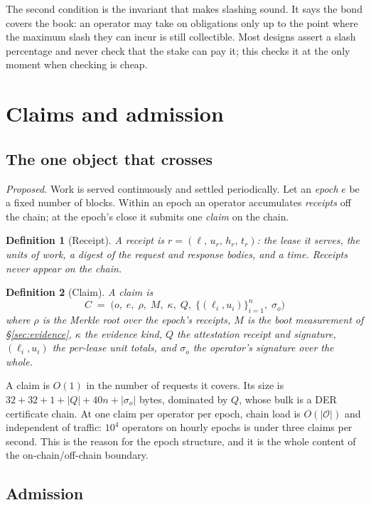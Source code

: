 \documentclass[11pt,a4paper]{article}
\newtheorem{definition}{Definition}[section]
\begin{document}
The second condition is the invariant that makes slashing sound. It says the
bond covers the book: an operator may take on obligations only up to the point
where the maximum slash they can incur is still collectible. Most designs assert
a slash percentage and never check that the stake can pay it; this checks it at
the only moment when checking is cheap.

\section{Claims and admission}
\label{sec:admit}

\subsection{The one object that crosses}

\emph{Proposed.} Work is served continuously and settled periodically. Let an
\emph{epoch} $e$ be a fixed number of blocks. Within an epoch an operator
accumulates \emph{receipts} off the chain; at the epoch's close it submits one
\emph{claim} on the chain.

\begin{definition}[Receipt]
A receipt is $r = (\ell,\, u_r,\, h_r,\, t_r)$: the lease it serves, the units of
work, a digest of the request and response bodies, and a time. Receipts never
appear on the chain.
\end{definition}

\begin{definition}[Claim]
A claim is
\[
  C \;=\; \bigl(o,\; e,\; \rho,\; M,\; \kappa,\; Q,\;
    \{(\ell_i, u_i)\}_{i=1}^{n},\; \sigma_o \bigr)
\]
where $\rho$ is the Merkle root over the epoch's receipts, $M$ is the boot
measurement of §\ref{sec:evidence}, $\kappa$ the evidence kind, $Q$ the
attestation receipt and signature, $(\ell_i, u_i)$ the per-lease unit totals, and
$\sigma_o$ the operator's signature over the whole.
\end{definition}

A claim is $O(1)$ in the number of requests it covers. Its size is
$32 + 32 + 1 + |Q| + 40n + |\sigma_o|$ bytes, dominated by $Q$, whose bulk is a
DER certificate chain. At one claim per operator per epoch, chain load is
$O(|\mathcal{O}|)$ and independent of traffic: $10^4$ operators on hourly epochs
is under three claims per second. This is the reason for the epoch structure, and
it is the whole content of the on-chain/off-chain boundary.

\subsection{Admission}
\end{document}
